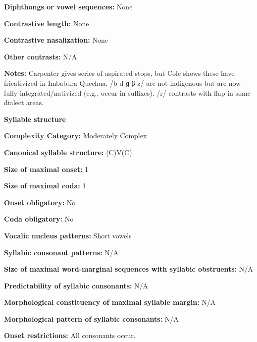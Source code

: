 \textbf{Diphthongs or vowel sequences:} None



\textbf{Contrastive length:} None



\textbf{Contrastive nasalization:} None



\textbf{Other contrasts:} N/A



\textbf{Notes:} Carpenter gives series of aspirated stops, but Cole shows these have fricativized in Imbabura Quechua. /b d ɡ β z/ are not indigenous but are now fully integrated/nativized (e.g., occur in suffixes). /r/ contrasts with flap in some dialect areas.



\textbf{Syllable structure}



\textbf{Complexity Category:} Moderately Complex



\textbf{Canonical syllable structure:} (C)V(C) \citep[203-5]{Cole1982}



\textbf{Size of maximal onset:} 1



\textbf{Size of maximal coda:} 1



\textbf{Onset obligatory:} No



\textbf{Coda obligatory:} No



\textbf{Vocalic nucleus patterns:} Short vowels



\textbf{Syllabic consonant patterns:} N/A



\textbf{Size of maximal word{}-marginal sequences with syllabic obstruents:} N/A



\textbf{Predictability of syllabic consonants:} N/A



\textbf{Morphological constituency of maximal syllable margin:} N/A



\textbf{Morphological pattern of syllabic consonants:} N/A



\textbf{Onset restrictions:} All consonants occur.



